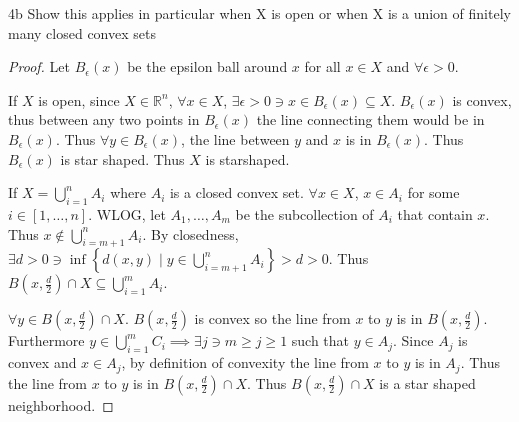 \documentclass{article}
\newcommand*{\subeq}{\subseteq}
\newcommand{\R}{\mathbb{R}}
\begin{document}
\begin{PROB}{4b}\label{Problem 4b.}
    Show this applies in particular when X is open or when X is a union of finitely many closed convex sets
\end{PROB}
\begin{proof}
    Let $B_\epsilon(x)$ be the epsilon ball around $x$ for all $x \in X$ and $\forall \epsilon > 0$.

    If $X$ is open, since $X \in \R^n$, $\forall x \in X$, $\exists \epsilon > 0 \ni x \in B_{\epsilon}(x) \subeq X$. $B_\epsilon(x)$ is convex, thus between any two points in $B_\epsilon(x)$ the line connecting them would be in $B_{\epsilon}(x)$. Thus $\forall y \in B_{\epsilon}(x)$, the line between $y$ and $x$ is in $B_\epsilon(x)$. Thus $B_\epsilon(x)$ is star shaped. Thus $X$ is starshaped. 
    
    If $X = \bigcup_{i = 1}^n A_i$ where $A_i$ is a closed convex set. $\forall x \in X$, $x \in A_i$ for some $i \in [1, \dots, n]$. WLOG, let $A_{1}, \dots, A_{m}$ be the subcollection of $A_i$ that contain $x$. Thus $x \not \in \bigcup_{i = m + 1}^ n A_i$. By closedness, $\exists d > 0 \ni \inf\left\{ d(x, y) \mid y \in \bigcup_{i = m + 1}^ n A_i \right\} > d > 0$. Thus $B(x, \frac{d}{2}) \cap X \subeq \bigcup_{i = 1}^m A_i$. 
    
    $\forall y \in B(x, \frac{d}{2}) \cap X$. $B(x, \frac{d}{2})$ is convex so the line from $x$ to $y$ is in $B(x, \frac{d}{2})$. Furthermore $y \in \bigcup_{i = 1}^m C_i \implies \exists j \ni m \geq j \geq 1$ such that $y \in A_j$. Since $A_j$ is convex and $x \in A_j$, by definition of convexity the line from $x$ to $y$ is in $A_j$. Thus the line from $x$ to $y$ is in $B(x, \frac{d}{2}) \cap X$. Thus $B(x, \frac{d}{2}) \cap X$ is a star shaped neighborhood.        
\end{proof}

\bigskip
\end{document}
